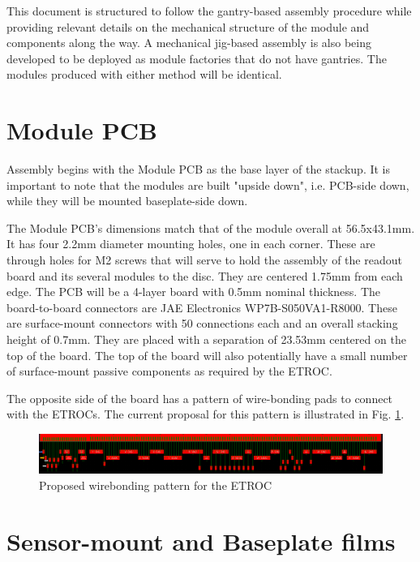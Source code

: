 \documentclass[10pt]{datasheet}
\begin{document}
This document is structured to follow the gantry-based assembly procedure while providing relevant details on the mechanical structure of the module and components along the way. A mechanical jig-based assembly is also being developed to be deployed as module factories that do not have gantries. The modules produced with either method will be identical.


\section{Module PCB}

Assembly begins with the Module PCB as the base layer of the stackup. It is important to note that the modules are built "upside down", i.e. PCB-side down, while they will be mounted baseplate-side down.

The Module PCB's dimensions match that of the module overall at 56.5x43.1mm. It has four 2.2mm diameter mounting holes, one in each corner. These are through holes for M2 screws that will serve to hold the assembly of the readout board and its several modules to the disc. They are centered 1.75mm from each edge. The PCB will be a 4-layer board with 0.5mm nominal thickness. The board-to-board connectors are JAE Electronics WP7B-S050VA1-R8000. These are surface-mount connectors with 50 connections each and an overall stacking height of 0.7mm. They are placed with a separation of 23.53mm centered on the top of the board. The top of the board will also potentially have a small number of surface-mount passive components as required by the ETROC.

The opposite side of the board has a pattern of wire-bonding pads to connect with the ETROCs. The current proposal for this pattern is illustrated in Fig. \ref{fig:wirebonding-pattern}.

\begin{figure}[h]
	\centering
    \includegraphics[width=\textwidth]{figures/wirebonding-pattern.png}
    \caption{Proposed wirebonding pattern for the ETROC}
    \label{fig:wirebonding-pattern}	
\end{figure}

\section{Sensor-mount and Baseplate films}
\end{document}
